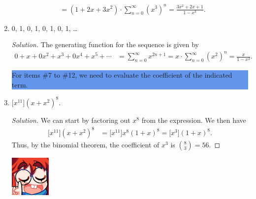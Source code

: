 \documentclass{article}
\newenvironment{solution}
  {\renewcommand\qedsymbol{$\blacksquare$}\begin{proof}[Solution]}
  {\end{proof}}
\begin{document}
\begin{enumerate}
\begin{align*}
        &= (1 + 2x + 3x^2) \cdot \sum_{n=0}^{\infty} {(x^3)}^n = \frac{3x^2 + 2x + 1}{1-x^3}. \tag*{$\blacksquare$}
    \end{align*} 
    \item 0, 1, 0, 1, 0, 1, 0, 1, \ldots\par 
    \textit{Solution.} The generating function for the sequence is given by\begin{align*} 
        0 + x + 0x^2 + x^3 + 0x^4 + x^5 + \cdots &= \sum_{n=0}^{\infty} x^{2n+1} = x \cdot \sum_{n=0}^{\infty} {(x^2)}^n = \frac{x}{1-x^2}. \tag*{$\blacksquare$}
    \end{align*} 
    \colorbox{CornflowerBlue}{
    \begin{minipage}[c]{0.9\textwidth}
        \centering
        For items \#7 to \#12, we need to evaluate the coefficient of the indicated term. 
    \end{minipage}
    }
    \item $\big[x^{11}\big]{(x+x^2)}^8$.\begin{solution} 
        We can start by factoring out $x^8$ from the expression. We then have\begin{align*} 
            \big[x^{11}\big]{(x+x^2)}^8 &= \big[ x^{11} \big] x^8 {(1+x)}^8 = \big[ x^{3} \big] {(1+x)}^8. 
        \end{align*} Thus, by the binomial theorem, the coefficient of $x^{3}$ is $\binom{8}{3} = 56$. 
    \end{solution}
    \begin{minipage}[t]{.14\textwidth}
        \vspace{0pt}
        \includegraphics[width=2cm]{nerd_maddy.png} 
    \end{minipage}%
\end{enumerate}
\end{document}

